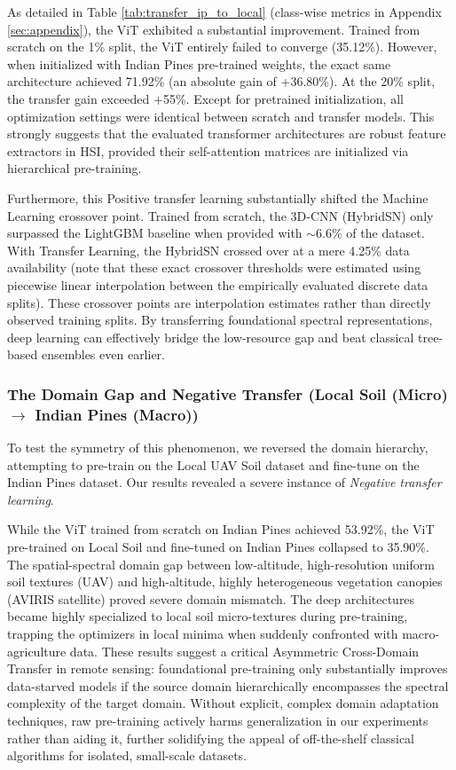\documentclass[pdflatex,sn-mathphys-num,iicol]{sn-jnl}
\begin{document}
As detailed in Table \ref{tab:transfer_ip_to_local} (class-wise metrics in Appendix \ref{sec:appendix}), the ViT exhibited a substantial improvement. Trained from scratch on the 1\% split, the ViT entirely failed to converge (35.12\%). However, when initialized with Indian Pines pre-trained weights, the exact same architecture achieved 71.92\% (an absolute gain of +36.80\%). At the 20\% split, the transfer gain exceeded +55\%. Except for pretrained initialization, all optimization settings were identical between scratch and transfer models. This strongly suggests that the evaluated transformer architectures are robust feature extractors in HSI, provided their self-attention matrices are initialized via hierarchical pre-training.

Furthermore, this Positive transfer learning substantially shifted the Machine Learning crossover point. Trained from scratch, the 3D-CNN (HybridSN) only surpassed the LightGBM baseline when provided with $\sim$6.6\% of the dataset. With Transfer Learning, the HybridSN crossed over at a mere 4.25\% data availability (note that these exact crossover thresholds were estimated using piecewise linear interpolation between the empirically evaluated discrete data splits). These crossover points are interpolation estimates rather than directly observed training splits. By transferring foundational spectral representations, deep learning can effectively bridge the low-resource gap and beat classical tree-based ensembles even earlier.

\subsubsection{The Domain Gap and Negative Transfer (Local Soil (Micro) $\rightarrow$ Indian Pines (Macro))}
To test the symmetry of this phenomenon, we reversed the domain hierarchy, attempting to pre-train on the Local UAV Soil dataset and fine-tune on the Indian Pines dataset. Our results revealed a severe instance of \textit{Negative transfer learning}. 

\par While the ViT trained from scratch on Indian Pines achieved 53.92\%, the ViT pre-trained on Local Soil and fine-tuned on Indian Pines collapsed to 35.90\%. The spatial-spectral domain gap between low-altitude, high-resolution uniform soil textures (UAV) and high-altitude, highly heterogeneous vegetation canopies (AVIRIS satellite) proved severe domain mismatch. The deep architectures became highly specialized to local soil micro-textures during pre-training, trapping the optimizers in local minima when suddenly confronted with macro-agriculture data. These results suggest a critical Asymmetric Cross-Domain Transfer in remote sensing: foundational pre-training only substantially improves data-starved models if the source domain hierarchically encompasses the spectral complexity of the target domain. Without explicit, complex domain adaptation techniques, raw pre-training actively harms generalization in our experiments rather than aiding it, further solidifying the appeal of off-the-shelf classical algorithms for isolated, small-scale datasets.
\end{document}
